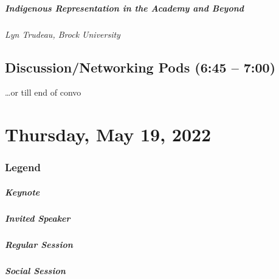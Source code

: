 \documentclass[
]{book}
\begin{document}
\begin{wp}
\hypertarget{indigenous-representation-in-the-academy-and-beyond}{%
\paragraph{Indigenous Representation in the Academy and
Beyond}\label{indigenous-representation-in-the-academy-and-beyond}}

\emph{Lyn Trudeau, Brock University}
\end{wp}

\hypertarget{discussionnetworking-pods-645-700-2}{%
\section*{Discussion/Networking Pods (6:45 -- 7:00)}\label{discussionnetworking-pods-645-700-2}}

\ldots or till end of convo

\hypertarget{thursday-may-19-2022}{%
\chapter{Thursday, May 19, 2022}\label{thursday-may-19-2022}}

\hypertarget{legend-3}{%
\subsection*{Legend}\label{legend-3}}

\begin{reflect}
\hypertarget{keynote}{%
\paragraph{Keynote}\label{keynote}}
\end{reflect}

\begin{wp}
\hypertarget{invited-speaker}{%
\paragraph{Invited Speaker}\label{invited-speaker}}
\end{wp}

\begin{secondary}
\hypertarget{regular-session}{%
\paragraph{Regular Session}\label{regular-session}}
\end{secondary}
\begin{gh}
\hypertarget{social-session}{%
\paragraph{Social Session}\label{social-session}}
\end{gh}
\end{document}
